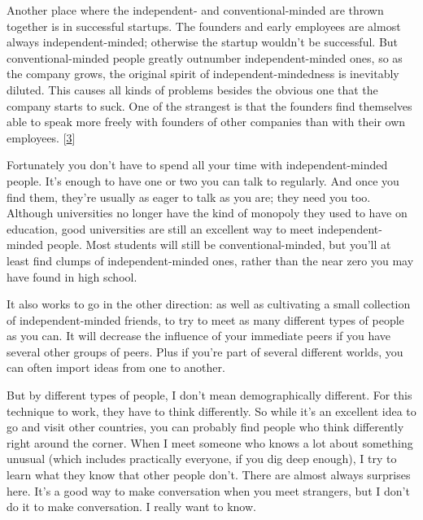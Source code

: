 Another place where the independent- and
                  conventional-minded are thrown together is in successful
                  startups. The founders and early employees are almost always
                  independent-minded; otherwise the startup wouldn't be
                  successful. But conventional-minded people greatly outnumber
                  independent-minded ones, so as the company grows, the original
                  spirit of independent-mindedness is inevitably diluted. This
                  causes all kinds of problems besides the obvious one that the
                  company starts to suck. One of the strangest is that the
                  founders find themselves able to speak more freely with
                  founders of other companies than with their own employees.
                  [\href{\#f3n}{3}]

Fortunately you don't have to spend all your time
                  with independent-minded people. It's enough to have one or two
                  you can talk to regularly. And once you find them, they're
                  usually as eager to talk as you are; they need you too.
                  Although universities no longer have the kind of monopoly they
                  used to have on education, good universities are still an
                  excellent way to meet independent-minded people. Most students
                  will still be conventional-minded, but you'll at least find
                  clumps of independent-minded ones, rather than the near zero
                  you may have found in high school.

It also works to
                  go in the other direction: as well as cultivating a small
                  collection of independent-minded friends, to try to meet as
                  many different types of people as you can. It will decrease
                  the influence of your immediate peers if you have several
                  other groups of peers. Plus if you're part of several
                  different worlds, you can often import ideas from one to
                  another.

But by different types of people, I don't
                  mean demographically different. For this technique to work,
                  they have to think differently. So while it's an excellent
                  idea to go and visit other countries, you can probably find
                  people who think differently right around the corner. When I
                  meet someone who knows a lot about something unusual (which
                  includes practically everyone, if you dig deep enough), I try
                  to learn what they know that other people don't. There are
                  almost always surprises here. It's a good way to make
                  conversation when you meet strangers, but I don't do it to
                  make conversation. I really want to know.

